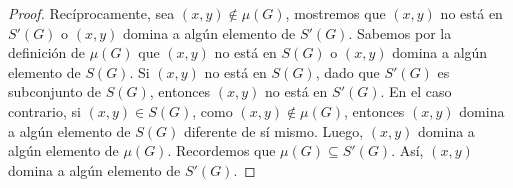 \begin{proof}
Recíprocamente, sea $(x,y)\notin \mu(G)$, mostremos que $(x,y)$ no está en $S'(G)$ o $(x,y)$ domina a algún elemento de $S'(G)$. Sabemos por la definición de $\mu(G)$ que $(x,y)$ no está en $S(G)$ o $(x,y)$ domina a algún elemento de $S(G)$. Si $(x,y)$ no está en $S(G)$, dado que $S'(G)$ es subconjunto de $S(G)$, entonces $(x,y)$ no está en $S'(G)$. En el caso contrario, si $(x,y)\in S(G)$, como $(x,y)\notin \mu(G)$, entonces $(x,y)$ domina a algún elemento de $S(G)$ diferente de sí mismo. Luego, $(x,y)$ domina a algún elemento de $\mu(G)$. Recordemos que $\mu(G)\subseteq S'(G)$. Así, $(x,y)$ domina a algún elemento de $S'(G)$.

\end{proof}
